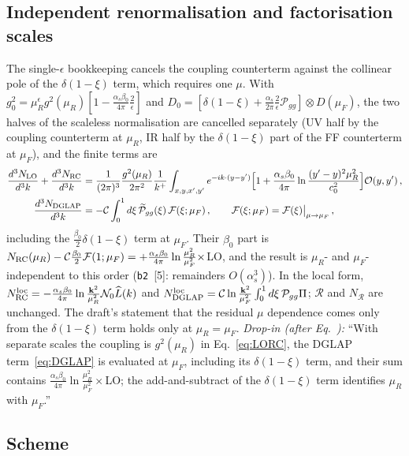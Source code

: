 \subsection{Independent renormalisation and factorisation scales}\label{sec:b-scales}
The single-$\epsilon$ bookkeeping cancels the coupling counterterm against the collinear pole of the $\delta(1-\xi)$ term, which requires one $\mu$. With $g^2_0=\mu_R^\epsilon g^2(\mu_R)[1-\frac{\alpha_s\beta_0}{4\pi}\frac2\epsilon]$ and $D_0=[\delta(1-\xi)+\frac{\alpha_s}{2\pi}\frac2\epsilon\mathcal P_{gg}]\otimes D(\mu_F)$, the two halves of the scaleless normalisation are cancelled separately (UV half by the coupling counterterm at $\mu_R$, IR half by the $\delta(1-\xi)$ part of the FF counterterm at $\mu_F$), and the finite terms are
\begin{align}
\frac{d^3N_{\rm LO}}{d^3k}+\frac{d^3N_{\rm RC}}{d^3k}&=\frac{1}{(2\pi)^3}\frac{g^2(\mu_R)}{2\pi^2}\frac{1}{k^+}\int_{x,y,x',y'}e^{-ik\cdot(y-y')}\Big[1+\frac{\alpha_s\beta_0}{4\pi}\ln\frac{(y'-y)^2\mu_R^2}{c_0^2}\Big]\mathcal O(y,y')\,,\notag\\
\frac{d^3N_{\rm DGLAP}}{d^3k}&=-\mathcal C\int_0^1d\xi\,\widetilde{\mathcal P}_{gg}(\xi)\,\mathcal F(\xi;\mu_F)\,,\qquad \mathcal F(\xi;\mu_F)=\mathcal F(\xi)\big|_{\mu\to\mu_F}\,,
\end{align}
including the $\frac{\beta_0}{2}\delta(1-\xi)$ term at $\mu_F$. Their $\beta_0$ part is $N_{\rm RC}(\mu_R)-\mathcal C\frac{\beta_0}{2}\mathcal F(1;\mu_F)=+\frac{\alpha_s\beta_0}{4\pi}\ln\frac{\mu_R^2}{\mu_F^2}\times$LO, and the result is $\mu_R$- and $\mu_F$-independent to this order (\texttt{b2}~[5]: remainders $O(\alpha_s^3)$). In the local form, $N^{\rm loc}_{\rm RC}=-\frac{\alpha_s\beta_0}{4\pi}\ln\frac{\mathbf{k}^2}{\mu_R^2}\mathcal N_0\widehat L(k)$ and $N^{\rm loc}_{\rm DGLAP}=\mathcal C\ln\frac{\mathbf{k}^2}{\mu_F^2}\int_0^1d\xi\,\mathcal P_{gg}\Pi$; $\mathcal R$ and $N_{\mathcal R}$ are unchanged. The draft's statement that the residual $\mu$ dependence comes only from the $\delta(1-\xi)$ term holds only at $\mu_R=\mu_F$. \emph{Drop-in (after Eq.~):} ``With separate scales the coupling is $g^2(\mu_R)$ in Eq.~\eqref{eq:LORC}, the DGLAP term~\eqref{eq:DGLAP} is evaluated at $\mu_F$, including its $\delta(1-\xi)$ term, and their sum contains $\frac{\alpha_s\beta_0}{4\pi}\ln\frac{\mu_R^2}{\mu_F^2}\times$LO; the add-and-subtract of the $\delta(1-\xi)$ term identifies $\mu_R$ with $\mu_F$.''

\subsection{Scheme}\label{sec:b-scheme}
